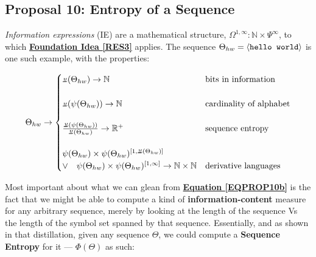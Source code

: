 \documentclass[a4paper, 18pt]{book} %
\newcommand{\invpi}{\rotatebox[origin=c]{180}{$\pi$}}
\begin{document}
\subsection{Proposal 10: Entropy of a Sequence\cite{lnspaper}}
\label{PROPTOE}

\textit{Information expressions} (IE)\cite{lnspaper} are a mathematical structure, $\Omega^{1,\infty} : \mathbb{N} \times \Psi^\infty$, to which \textbf{\hyperref[RES3]{Foundation Idea \ref{RES3}}} applies. The sequence $\Theta_{hw} = \langle \text{\texttt{hello world}} \rangle$ is one such example, with the properties:

\vspace{1em}
\begin{equation}
\label{EQPROP10b}
\Theta_{hw} \rightarrow \begin{cases}
\invpi(\Theta_{hw}) \rightarrow \mathbb{N} & \text{bits in information}\\\\
\invpi(\psi(\Theta_{hw})) \rightarrow \mathbb{N} & \text{cardinality of alphabet}\\\\
\frac{\invpi(\psi(\Theta_{hw}))}{\invpi(\Theta_{hw})} \rightarrow \mathbb{R^+} & \text{sequence entropy}\\\\
\psi(\Theta_{hw}) \times \psi(\Theta_{hw})^{[1,\invpi(\Theta_{hw})]} \quad\\ \lor \quad \psi(\Theta_{hw}) \times \psi(\Theta_{hw})^{[1,\infty]} \rightarrow \mathbb{N} \times \mathbb{N} & \text{derivative languages}\\
\end{cases}
\end{equation}
\vspace{1em}


Most important about what we can glean from \textbf{\hyperref[EQPROP10b]{Equation \ref{EQPROP10b}}} is the fact that we might be able to compute a kind of \textbf{information-content} measure for any arbitrary sequence, merely by looking at the length of the sequence Vs the length of the symbol set spanned by that sequence. Essentially, and as shown in that distillation, given any sequence $\Theta$, we could compute a \textbf{Sequence Entropy} for it --- $\Phi(\Theta)$ as such:
\end{document}
